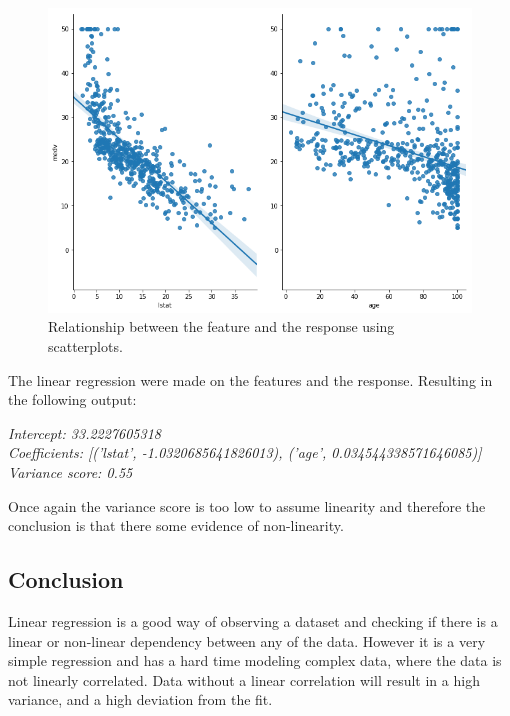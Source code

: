 \begin{figure}[h]
	\centering
	\includegraphics[scale=0.4]{regression/multipleLinearRegression/fig/bostonPairplotMdevLstatAge.png}
	\caption{Relationship between the feature and the response using scatterplots.}
	\label{fig:bostonPairplotMdevLstatAge}
\end{figure}

The linear regression were made on the features and the response. Resulting in the following output:

\noindent\textit{Intercept: 33.2227605318\\
	Coefficients: [('lstat', -1.0320685641826013), ('age', 0.034544338571646085)]\\
	Variance score: 0.55\\}

Once again the variance score is too low to assume linearity and therefore the conclusion is that there some evidence of non-linearity.

\subsection{Conclusion}
Linear regression is a good way of observing a dataset and checking if there is a linear or non-linear dependency between any of the data. However it is a very simple regression and has a hard time modeling complex data, where the data is not linearly correlated. Data without a linear correlation will result in a high variance, and a high deviation from the fit.